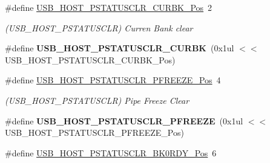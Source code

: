 \begin{DoxyCompactItemize}
\item 
\hypertarget{group___s_a_m_l21___u_s_b_ga08ea45defeeadacf8ebf26fe2f1eab88}{}\#define \hyperlink{group___s_a_m_l21___u_s_b_ga08ea45defeeadacf8ebf26fe2f1eab88}{U\+S\+B\+\_\+\+H\+O\+S\+T\+\_\+\+P\+S\+T\+A\+T\+U\+S\+C\+L\+R\+\_\+\+C\+U\+R\+B\+K\+\_\+\+Pos}~2\label{group___s_a_m_l21___u_s_b_ga08ea45defeeadacf8ebf26fe2f1eab88}

\begin{DoxyCompactList}\small\item\em (U\+S\+B\+\_\+\+H\+O\+S\+T\+\_\+\+P\+S\+T\+A\+T\+U\+S\+C\+L\+R) Curren Bank clear \end{DoxyCompactList}\item 
\hypertarget{group___s_a_m_l21___u_s_b_ga2a86800eeaa20d8a161db5c2e7ddb73e}{}\#define {\bfseries U\+S\+B\+\_\+\+H\+O\+S\+T\+\_\+\+P\+S\+T\+A\+T\+U\+S\+C\+L\+R\+\_\+\+C\+U\+R\+B\+K}~(0x1ul $<$$<$ U\+S\+B\+\_\+\+H\+O\+S\+T\+\_\+\+P\+S\+T\+A\+T\+U\+S\+C\+L\+R\+\_\+\+C\+U\+R\+B\+K\+\_\+\+Pos)\label{group___s_a_m_l21___u_s_b_ga2a86800eeaa20d8a161db5c2e7ddb73e}

\item 
\hypertarget{group___s_a_m_l21___u_s_b_ga6ef007165e7b1ca7d2f12e64065fb86f}{}\#define \hyperlink{group___s_a_m_l21___u_s_b_ga6ef007165e7b1ca7d2f12e64065fb86f}{U\+S\+B\+\_\+\+H\+O\+S\+T\+\_\+\+P\+S\+T\+A\+T\+U\+S\+C\+L\+R\+\_\+\+P\+F\+R\+E\+E\+Z\+E\+\_\+\+Pos}~4\label{group___s_a_m_l21___u_s_b_ga6ef007165e7b1ca7d2f12e64065fb86f}

\begin{DoxyCompactList}\small\item\em (U\+S\+B\+\_\+\+H\+O\+S\+T\+\_\+\+P\+S\+T\+A\+T\+U\+S\+C\+L\+R) Pipe Freeze Clear \end{DoxyCompactList}\item 
\hypertarget{group___s_a_m_l21___u_s_b_gaba682d6c59f325f8d4eba5ec0164e3f2}{}\#define {\bfseries U\+S\+B\+\_\+\+H\+O\+S\+T\+\_\+\+P\+S\+T\+A\+T\+U\+S\+C\+L\+R\+\_\+\+P\+F\+R\+E\+E\+Z\+E}~(0x1ul $<$$<$ U\+S\+B\+\_\+\+H\+O\+S\+T\+\_\+\+P\+S\+T\+A\+T\+U\+S\+C\+L\+R\+\_\+\+P\+F\+R\+E\+E\+Z\+E\+\_\+\+Pos)\label{group___s_a_m_l21___u_s_b_gaba682d6c59f325f8d4eba5ec0164e3f2}

\item 
\hypertarget{group___s_a_m_l21___u_s_b_gaf62a7896e46401a67d8c6f50566d847d}{}\#define \hyperlink{group___s_a_m_l21___u_s_b_gaf62a7896e46401a67d8c6f50566d847d}{U\+S\+B\+\_\+\+H\+O\+S\+T\+\_\+\+P\+S\+T\+A\+T\+U\+S\+C\+L\+R\+\_\+\+B\+K0\+R\+D\+Y\+\_\+\+Pos}~6\label{group___s_a_m_l21___u_s_b_gaf62a7896e46401a67d8c6f50566d847d}


\end{DoxyCompactItemize}
